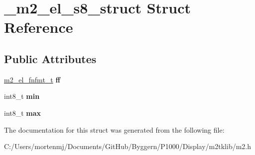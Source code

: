 \hypertarget{struct__m2__el__s8__struct}{\section{\-\_\-m2\-\_\-el\-\_\-s8\-\_\-struct Struct Reference}
\label{struct__m2__el__s8__struct}
}
\subsection*{Public Attributes}
\begin{DoxyCompactItemize}
\item 
\hypertarget{struct__m2__el__s8__struct_a7d9cbb17871f2d1572e3a05b2cda6a82}{\hyperlink{struct__m2__el__fnfmt__struct}{m2\-\_\-el\-\_\-fnfmt\-\_\-t} {\bfseries ff}}\label{struct__m2__el__s8__struct_a7d9cbb17871f2d1572e3a05b2cda6a82}

\item 
\hypertarget{struct__m2__el__s8__struct_ac58677c647c9170674908ca78c56cebf}{int8\-\_\-t {\bfseries min}}\label{struct__m2__el__s8__struct_ac58677c647c9170674908ca78c56cebf}

\item 
\hypertarget{struct__m2__el__s8__struct_a569f9e136b5971bb18bde36bcfebba72}{int8\-\_\-t {\bfseries max}}\label{struct__m2__el__s8__struct_a569f9e136b5971bb18bde36bcfebba72}

\end{DoxyCompactItemize}


The documentation for this struct was generated from the following file\-:\begin{DoxyCompactItemize}
\item 
C\-:/\-Users/mortenmj/\-Documents/\-Git\-Hub/\-Byggern/\-P1000/\-Display/m2tklib/m2.\-h\end{DoxyCompactItemize}
